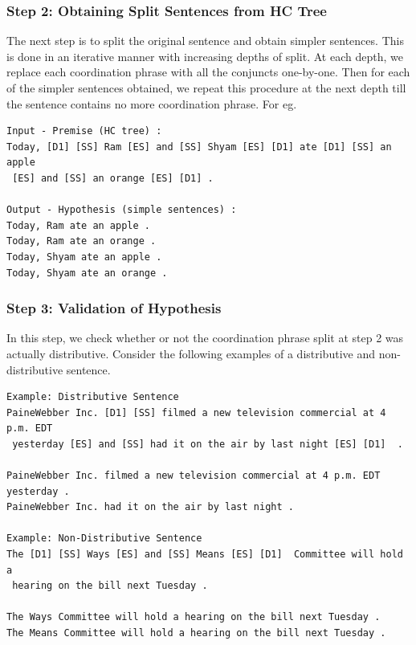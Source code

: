         \subsubsection{Step 2: Obtaining Split Sentences from HC Tree}

            The next step is to split the original sentence and obtain simpler sentences. This is done in an iterative manner with increasing depths of split. At each depth, we replace each coordination phrase with all the conjuncts one-by-one. Then for each of the simpler sentences obtained, we repeat this procedure at the next depth till the sentence contains no more coordination phrase. For eg.

            \begin{verbatim}
Input - Premise (HC tree) :
Today, [D1] [SS] Ram [ES] and [SS] Shyam [ES] [D1] ate [D1] [SS] an apple
 [ES] and [SS] an orange [ES] [D1] .

Output - Hypothesis (simple sentences) :
Today, Ram ate an apple .
Today, Ram ate an orange .
Today, Shyam ate an apple .
Today, Shyam ate an orange .
            \end{verbatim}

        \subsubsection{Step 3: Validation of Hypothesis}

            In this step, we check whether or not the coordination phrase split at step 2 was actually distributive. Consider the following examples of a distributive and non-distributive sentence.
            
            \begin{verbatim}
Example: Distributive Sentence
PaineWebber Inc. [D1] [SS] filmed a new television commercial at 4 p.m. EDT
 yesterday [ES] and [SS] had it on the air by last night [ES] [D1]  .

PaineWebber Inc. filmed a new television commercial at 4 p.m. EDT yesterday .
PaineWebber Inc. had it on the air by last night .

Example: Non-Distributive Sentence
The [D1] [SS] Ways [ES] and [SS] Means [ES] [D1]  Committee will hold a
 hearing on the bill next Tuesday .

The Ways Committee will hold a hearing on the bill next Tuesday .
The Means Committee will hold a hearing on the bill next Tuesday .
            \end{verbatim}

